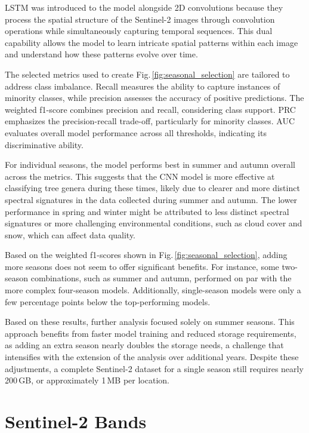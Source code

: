 LSTM was introduced to the model alongside 2D convolutions because they process the spatial structure of the Sentinel-2 images through convolution operations while simultaneously capturing temporal sequences. This dual capability allows the model to learn intricate spatial patterns within each image and understand how these patterns evolve over time.

The selected metrics used to create Fig.\,\ref{fig:seasonal_selection} are tailored to address class imbalance. Recall measures the ability to capture instances of minority classes, while precision assesses the accuracy of positive predictions. The weighted f1-score combines precision and recall, considering class support. PRC emphasizes the precision-recall trade-off, particularly for minority classes. AUC evaluates overall model performance across all thresholds, indicating its discriminative ability.

For individual seasons, the model performs best in summer and autumn overall across the metrics. This suggests that the CNN model is more effective at classifying tree genera during these times, likely due to clearer and more distinct spectral signatures in the data collected during summer and autumn. The lower performance in spring and winter might be attributed to less distinct spectral signatures or more challenging environmental conditions, such as cloud cover and snow, which can affect data quality.

Based on the weighted f1-scores shown in Fig.\,\ref{fig:seasonal_selection}, adding more seasons does not seem to offer significant benefits. For instance, some two-season combinations, such as summer and autumn, performed on par with the more complex four-season models. Additionally, single-season models were only a few percentage points below the top-performing models.

Based on these results, further analysis focused solely on summer seasons. This approach benefits from faster model training and reduced storage requirements, as adding an extra season nearly doubles the storage needs, a challenge that intensifies with the extension of the analysis over additional years. Despite these adjustments, a complete Sentinel-2 dataset for a single season still requires nearly 200\,GB, or approximately 1\,MB per location.

\section{Sentinel-2 Bands}

